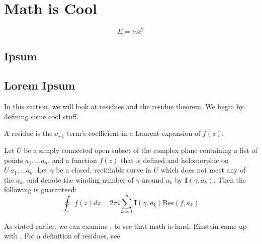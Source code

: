 \documentclass{./scibookneue-screen}
\begin{document}
\chapter{Math is Cool}
\begin{equation}\label{eq:einst}
	E = mc^2
\end{equation}

\lipsum[1-8]
\section{Ipsum}

\lipsum[1]
\lipsum[2]
\lipsum[3]

\lipsum[1]
\lipsum[2]
\lipsum[3]

\lipsum[1]
\marginpar{%

}

\lipsum[2]
\lipsum[3]

\section{Lorem Ipsum}
In this section, we will look at residues and the residue theorem.
We begin by defining some cool stuff.\\

\begin{mdef}\label{mdef:res}
	A residue is the $c_{-1}$ term's coefficient in a Laurent expansion of $f(z)$. 
\end{mdef}
\lipsum[1]
\begin{mthm}\label{mthm:residue}
Let $U$ be a simply connected open subset of the complex plane containing a list of points $a_1, ... a_n$, 
and a function $f(z)$ that is defined and holomorphic on $U \ {a_1,\ldots a_n}$.
Let $\gamma$ be a closed, rectifiable curve in $U$ which does not meet any of the $a_k$, 
and denote the winding number of $\gamma$ around $a_k$ by $\mathbf{I}(\gamma, a_k)$.
Then the following is guaranteed:
\begin{equation}
	\oint_\gamma f(z) dz = 2\pi i \sum_{k=1} ^n \mathbf{I}(\gamma, a_k) \mathrm{Res}\left(f,a_k\right)
\end{equation}
\end{mthm}


\begin{mproof}
	\lipsum[5]
\end{mproof}
\lipsum[1-2]
\lipsum[4]

As stated earlier, we can examine , to see that math is hard. Einstein came up
with . For a definition of residues, see 
\end{document}
